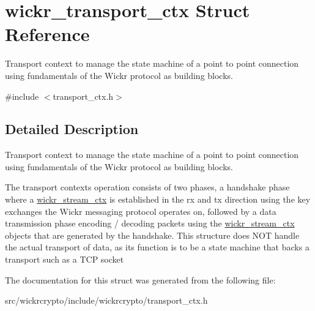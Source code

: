 \hypertarget{structwickr__transport__ctx}{}\section{wickr\+\_\+transport\+\_\+ctx Struct Reference}
\label{structwickr__transport__ctx}


Transport context to manage the state machine of a point to point connection using fundamentals of the Wickr protocol as building blocks.  




{\ttfamily \#include $<$transport\+\_\+ctx.\+h$>$}



\subsection{Detailed Description}
Transport context to manage the state machine of a point to point connection using fundamentals of the Wickr protocol as building blocks. 

The transport context\textquotesingle{}s operation consists of two phases, a handshake phase where a \mbox{\hyperlink{structwickr__stream__ctx}{wickr\+\_\+stream\+\_\+ctx}} is established in the rx and tx direction using the key exchanges the Wickr messaging protocol operates on, followed by a data transmission phase encoding / decoding packets using the \mbox{\hyperlink{structwickr__stream__ctx}{wickr\+\_\+stream\+\_\+ctx}} objects that are generated by the handshake. This structure does N\+OT handle the actual transport of data, as it\textquotesingle{}s function is to be a state machine that backs a transport such as a T\+CP socket 

The documentation for this struct was generated from the following file\+:\begin{DoxyCompactItemize}
\item 
src/wickrcrypto/include/wickrcrypto/transport\+\_\+ctx.\+h\end{DoxyCompactItemize}
